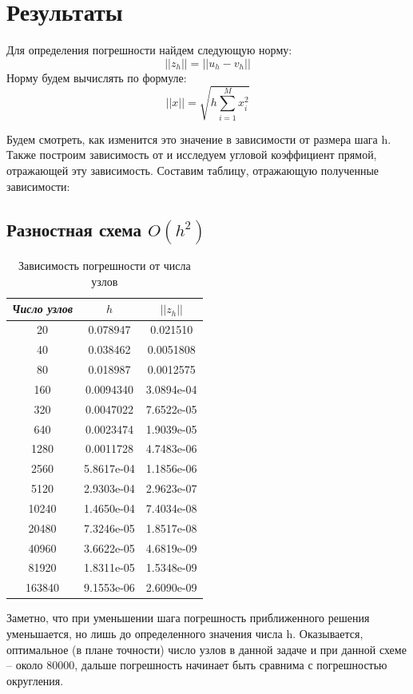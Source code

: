 \documentclass[12pt]{article}
\begin{document}
\section{Результаты}
Для определения погрешности найдем следующую норму:
$$
||z_h|| = || u_h - v_h ||
$$
Норму будем вычислять по формуле:
$$
||x|| = \sqrt{h\sum\limits_{i=1}^M x_i^2}
$$

Будем смотреть, как изменится это значение в зависимости от размера шага h. Также построим зависимость  от  и исследуем угловой коэффициент прямой, отражающей эту зависимость. Составим таблицу, отражающую полученные зависимости:

\subsection{Разностная схема $O(h^2)$}

\begin{table}[H]
\caption{Зависимость погрешности от числа узлов}
\begin{center}
\begin{tabular}{|c|c|c|}
\hline
\textit{Число узлов} &$ h$ & $||z_h||$  \\
\hline
20 & 0.078947 & 0.021510 \\
\hline
40 & 0.038462 & 0.0051808 \\
\hline
80 & 0.018987 & 0.0012575 \\
\hline
160 & 0.0094340 & 3.0894e-04 \\
\hline
320 & 0.0047022 & 7.6522e-05 \\
\hline
640 & 0.0023474 & 1.9039e-05 \\
\hline
1280 & 0.0011728 & 4.7483e-06 \\
\hline
2560 & 5.8617e-04 & 1.1856e-06 \\
\hline
5120 & 2.9303e-04 & 2.9623e-07 \\
\hline
10240 & 1.4650e-04 & 7.4034e-08 \\
\hline
20480 & 7.3246e-05 & 1.8517e-08 \\
\hline
40960 & 3.6622e-05 & 4.6819e-09 \\
\hline
81920 & 1.8311e-05 & 1.5348e-09 \\
\hline
163840 & 9.1553e-06 & 2.6090e-09 \\
\hline

\end{tabular}
\end{center}
\end{table}


Заметно, что при уменьшении шага погрешность приближенного решения уменьшается, но лишь до определенного значения числа h. Оказывается, оптимальное (в плане точности) число узлов в данной задаче и при данной схеме – около 80000, дальше погрешность начинает быть сравнима с погрешностью округления.
\end{document}
